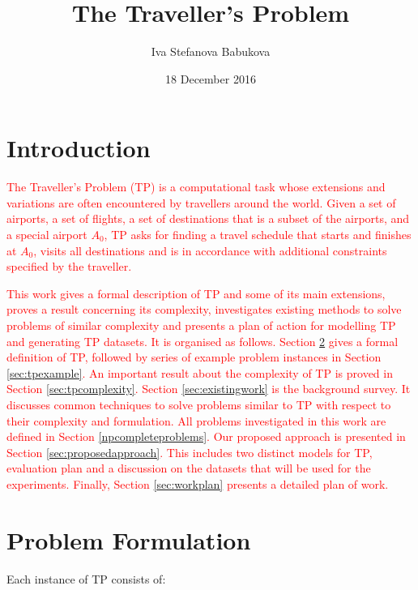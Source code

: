 \documentclass{mprop}
\theoremstyle{definition}
\begin{document}
\title{The Traveller's Problem}
\author{Iva Stefanova Babukova}
\date{18 December 2016}
\maketitle
\tableofcontents
\educationalconsent
\newpage

\section{Introduction}\label{intro}
\textcolor{red}{
The Traveller’s Problem (TP) is a computational task whose extensions and variations are often encountered by travellers around the world.
Given a set of airports, a set of flights, a set of destinations that is a subset of the airports, and a special airport $A_{0}$, TP asks for finding a travel schedule that starts and finishes at $A_{0}$, visits all destinations and is in accordance with additional constraints specified by the traveller.}

\textcolor{red}{This work gives a formal description of TP and some of its main extensions, proves a result concerning its complexity, investigates existing methods to solve problems of similar complexity and presents a plan of action for modelling TP and generating TP datasets.
It is organised as follows. Section \ref{sec:tpformulation} gives a formal definition of TP, followed by series of example problem instances in Section \ref{sec:tpexample}. An important result about the complexity of TP is proved in Section \ref{sec:tpcomplexity}. Section \ref{sec:existingwork} is the background survey. It discusses common techniques to solve problems similar to TP with respect to their complexity and formulation. All problems investigated in this work are defined in Section \ref{npcompleteproblems}. Our proposed approach is presented in Section \ref{sec:proposedapproach}. This includes two distinct models for TP, evaluation plan and a discussion on the datasets that will be used for the experiments. Finally, Section \ref{sec:workplan} presents a detailed plan of work.}

\section{Problem Formulation}
\label{sec:tpformulation}

Each instance of TP consists of:
\end{document}
